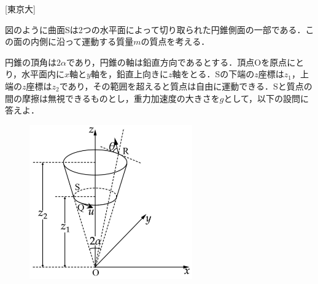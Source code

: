 

\noindent
{} [東京大]


図のように曲面Sは2つの水平面によって切り取られた円錐側面の一部である．この面の内側に沿って運動する質量$m$の質点を考える．

円錐の頂角は$2 \alpha$であり，円錐の軸は鉛直方向であるとする．頂点Oを原点にとり，水平面内に$x$軸と$y$軸を，鉛直上向きに$z$軸をとる．Sの下端の$z$座標は$z_1$，上端の$z$座標は$z_2$であり，その範囲を超えると質点は自由に運動できる．Sと質点の間の摩擦は無視できるものとし，重力加速度の大きさを$g$として，以下の設問に答えよ．

\begin{figure}[H]
  \centering
  \includegraphics[width=7cm]{fig/fig_1_8.pdf}
\end{figure}

